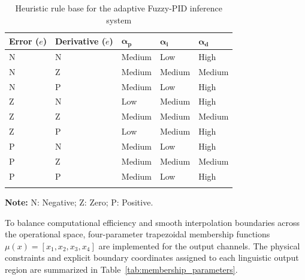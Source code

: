 \documentclass[pdflatex,sn-mathphys-num,iicol]{sn-jnl}
\theoremstyle{thmstyleone}%
\theoremstyle{thmstyletwo}%
\theoremstyle{thmstylethree}%
\begin{document}
\begin{table}[h]
\caption{Heuristic rule base for the adaptive Fuzzy-PID inference system}\label{tab:fuzzy_rules}%
\begin{center}
\begin{minipage}{\columnwidth}
\footnotesize
\begin{tabular*}{\columnwidth}{@{\extracolsep{\fill}}@{}lllll@{}}
\toprule
\textbf{Error ($e$)} & \textbf{Derivative ($\dot{e}$)} & $\mathbf{\alpha_p}$ & $\mathbf{\alpha_i}$ & $\mathbf{\alpha_d}$ \\
\midrule
N & N & Medium & Low & High \\
N & Z & Medium & Medium & Medium \\
N & P & Medium & Low & High \\
\midrule
Z & N & Low & Medium & High \\
Z & Z & Medium & Medium & Medium \\
Z & P & Low & Medium & High \\
\midrule
P & N & Medium & Low & High \\
P & Z & Medium & Medium & Medium \\
P & P & Medium & Low & High \\
\botrule
\end{tabular*}
\vskip 4pt
\scriptsize\textbf{Note:} N: Negative; Z: Zero; P: Positive.
\end{minipage}
\end{center}
\end{table}

To balance computational efficiency and smooth interpolation boundaries across the operational space, four-parameter trapezoidal membership functions $\mu(x) = [x_1, x_2, x_3, x_4]$ are implemented for the output channels. The physical constraints and explicit boundary coordinates assigned to each linguistic output region are summarized in Table~\ref{tab:membership_parameters}.
\end{document}
